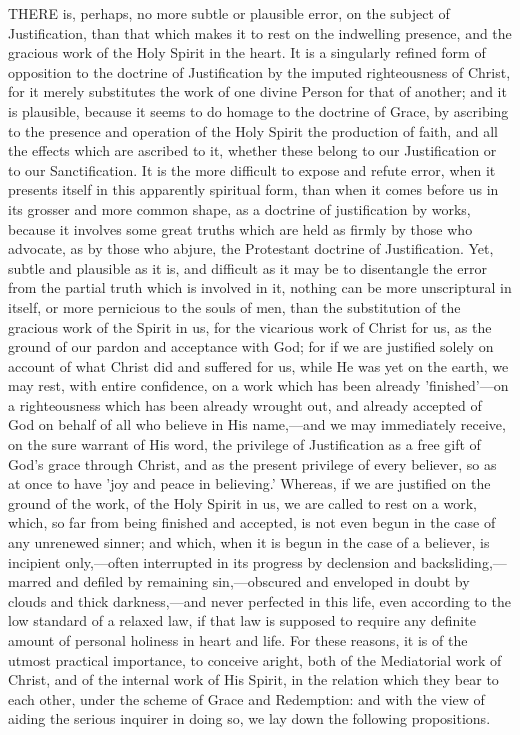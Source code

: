\documentclass[
]{book}
\begin{document}
THERE is, perhaps, no more subtle or plausible error, on the subject of Justification, than that which makes it to rest on the indwelling presence, and the gracious work of the Holy Spirit in the heart. It is a singularly refined form of opposition to the doctrine of Justification by the imputed righteousness of Christ, for it merely substitutes the work of one divine Person for that of another; and it is plausible, because it seems to do homage to the doctrine of Grace, by ascribing to the presence and operation of the Holy Spirit the production of faith, and all the effects which are ascribed to it, whether these belong to our Justification or to our Sanctification. It is the more difficult to expose and refute error, when it presents itself in this apparently spiritual form, than when it comes before us in its grosser and more common shape, as a doctrine of justification by works, because it involves some great truths which are held as firmly by those who advocate, as by those who abjure, the Protestant doctrine of Justification. Yet, subtle and plausible as it is, and difficult as it may be to disentangle the error from the partial truth which is involved in it, nothing can be more unscriptural in itself, or more pernicious to the souls of men, than the substitution of the gracious work of the Spirit in us, for the vicarious work of Christ for us, as the ground of our pardon and acceptance with God; for if we are justified solely on account of what Christ did and suffered for us, while He was yet on the earth, we may rest, with entire confidence, on a work which has been already 'finished'---on a righteousness which has been already wrought out, and already accepted of God on behalf of all who believe in His name,---and we may immediately receive, on the sure warrant of His word, the privilege of Justification as a free gift of God's grace through Christ, and as the present privilege of every believer, so as at once to have 'joy and peace in believing.' Whereas, if we are justified on the ground of the work, of the Holy Spirit in us, we are called to rest on a work, which, so far from being finished and accepted, is not even begun in the case of any unrenewed sinner; and which, when it is begun in the case of a believer, is incipient only,---often interrupted in its progress by declension and backsliding,---marred and defiled by remaining sin,---obscured and enveloped in doubt by clouds and thick darkness,---and never perfected in this life, even according to the low standard of a relaxed law, if that law is supposed to require any definite amount of personal holiness in heart and life. For these reasons, it is of the utmost practical importance, to conceive aright, both of the Mediatorial work of Christ, and of the internal work of His Spirit, in the relation which they bear to each other, under the scheme of Grace and Redemption: and with the view of aiding the serious inquirer in doing so, we lay down the following propositions.
\end{document}
